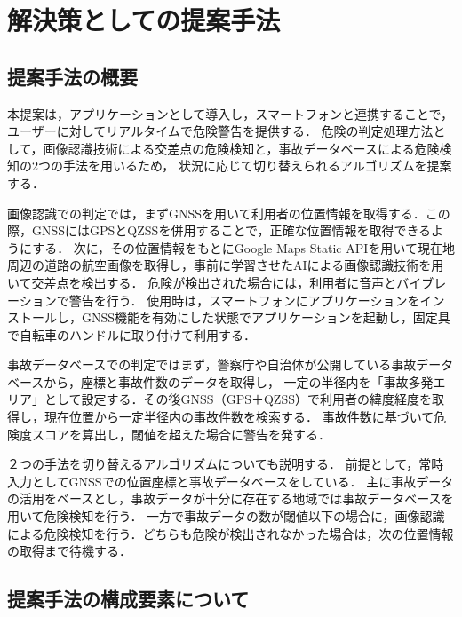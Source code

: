 \documentclass[uplatex,dvipdfmx]{jsarticle}
\begin{document}
\section{解決策としての提案手法}

\subsection{提案手法の概要}
本提案は，アプリケーションとして導入し，スマートフォンと連携することで，ユーザーに対してリアルタイムで危険警告を提供する．
危険の判定処理方法として，画像認識技術による交差点の危険検知と，事故データベースによる危険検知の2つの手法を用いるため，
状況に応じて切り替えられるアルゴリズムを提案する．

画像認識での判定では，まずGNSSを用いて利用者の位置情報を取得する．この際，GNSSにはGPSとQZSSを併用することで，正確な位置情報を取得できるようにする．
次に，その位置情報をもとにGoogle Maps Static APIを用いて現在地周辺の道路の航空画像を取得し，事前に学習させたAIによる画像認識技術を用いて交差点を検出する．
危険が検出された場合には，利用者に音声とバイブレーションで警告を行う．
使用時は，スマートフォンにアプリケーションをインストールし，GNSS機能を有効にした状態でアプリケーションを起動し，固定具で自転車のハンドルに取り付けて利用する．

事故データベースでの判定ではまず，警察庁や自治体が公開している事故データベースから，座標と事故件数のデータを取得し，
一定の半径内を「事故多発エリア」として設定する．その後GNSS（GPS＋QZSS）で利用者の緯度経度を取得し，現在位置から一定半径内の事故件数を検索する．
事故件数に基づいて危険度スコアを算出し，閾値を超えた場合に警告を発する．

２つの手法を切り替えるアルゴリズムについても説明する．
前提として，常時入力としてGNSSでの位置座標と事故データベースをしている．
主に事故データの活用をベースとし，事故データが十分に存在する地域では事故データベースを用いて危険検知を行う．
一方で事故データの数が閾値以下の場合に，画像認識による危険検知を行う．どちらも危険が検出されなかった場合は，次の位置情報の取得まで待機する．

\subsection{提案手法の構成要素について}
\end{document}
